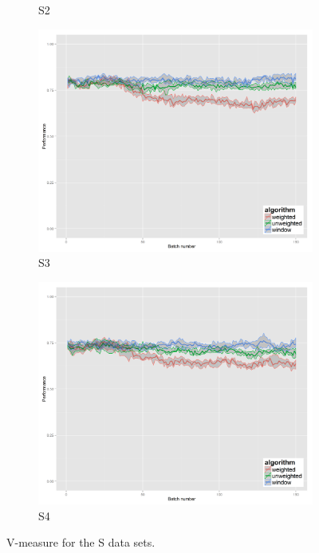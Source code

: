 \begin{figure}[H]
\begin{subfigure}{.45\textwidth}
  \caption{S2}
\end{subfigure}
\begin{subfigure}{.45\textwidth}
  \centering
  \includegraphics[width=.9\linewidth]{s_set/s_set_3_ci_one_size_vmeasure.png}
  \caption{S3}
\end{subfigure}%
\begin{subfigure}{.45\textwidth}
  \centering
  \includegraphics[width=.9\linewidth]{s_set/s_set_4_ci_one_size_vmeasure.png}
  \caption{S4}
\end{subfigure}
\caption{V-measure for the S data sets.}
\label{fig:s_set_vmeasure}
\end{figure}

